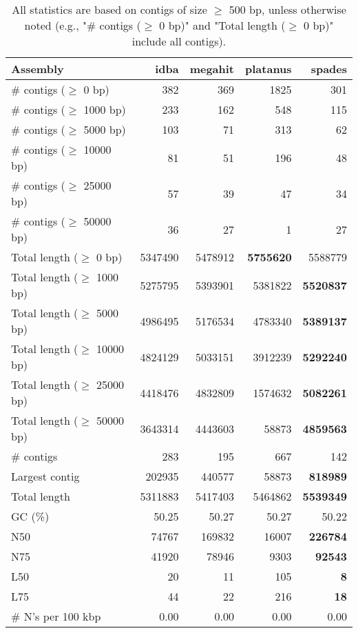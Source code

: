 \documentclass[12pt,a4paper]{article}
\begin{document}
\begin{table}[ht]
\begin{center}
\caption{All statistics are based on contigs of size $\geq$ 500 bp, unless otherwise noted (e.g., "\# contigs ($\geq$ 0 bp)" and "Total length ($\geq$ 0 bp)" include all contigs).}
\begin{tabular}{|l*{4}{|r}|}
\hline
Assembly & idba & megahit & platanus & spades \\ \hline
\# contigs ($\geq$ 0 bp) & 382 & 369 & 1825 & 301 \\ \hline
\# contigs ($\geq$ 1000 bp) & 233 & 162 & 548 & 115 \\ \hline
\# contigs ($\geq$ 5000 bp) & 103 & 71 & 313 & 62 \\ \hline
\# contigs ($\geq$ 10000 bp) & 81 & 51 & 196 & 48 \\ \hline
\# contigs ($\geq$ 25000 bp) & 57 & 39 & 47 & 34 \\ \hline
\# contigs ($\geq$ 50000 bp) & 36 & 27 & 1 & 27 \\ \hline
Total length ($\geq$ 0 bp) & 5347490 & 5478912 & {\bf 5755620} & 5588779 \\ \hline
Total length ($\geq$ 1000 bp) & 5275795 & 5393901 & 5381822 & {\bf 5520837} \\ \hline
Total length ($\geq$ 5000 bp) & 4986495 & 5176534 & 4783340 & {\bf 5389137} \\ \hline
Total length ($\geq$ 10000 bp) & 4824129 & 5033151 & 3912239 & {\bf 5292240} \\ \hline
Total length ($\geq$ 25000 bp) & 4418476 & 4832809 & 1574632 & {\bf 5082261} \\ \hline
Total length ($\geq$ 50000 bp) & 3643314 & 4443603 & 58873 & {\bf 4859563} \\ \hline
\# contigs & 283 & 195 & 667 & 142 \\ \hline
Largest contig & 202935 & 440577 & 58873 & {\bf 818989} \\ \hline
Total length & 5311883 & 5417403 & 5464862 & {\bf 5539349} \\ \hline
GC (\%) & 50.25 & 50.27 & 50.27 & 50.22 \\ \hline
N50 & 74767 & 169832 & 16007 & {\bf 226784} \\ \hline
N75 & 41920 & 78946 & 9303 & {\bf 92543} \\ \hline
L50 & 20 & 11 & 105 & {\bf 8} \\ \hline
L75 & 44 & 22 & 216 & {\bf 18} \\ \hline
\# N's per 100 kbp & 0.00 & 0.00 & 0.00 & 0.00 \\ \hline
\end{tabular}
\end{center}
\end{table}
\end{document}
